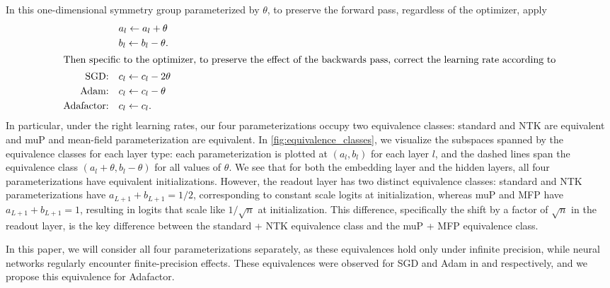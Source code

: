 \documentclass{article}
\theoremstyle{plain}
\theoremstyle{definition}
\theoremstyle{remark}
\begin{document}
In this one-dimensional symmetry group parameterized by $\theta$, to preserve the forward pass, regardless of the optimizer, apply
\begingroup
\begin{align*}
    &a_l \leftarrow a_l + \theta\MoveEqLeft[1]\\
    &b_l \leftarrow b_l - \theta.\\
\intertext{Then specific to the optimizer, to preserve the effect of the backwards pass, correct the learning rate according to}
    \textrm{SGD:}\quad&c_l \leftarrow c_l - 2\theta\\
    \textrm{Adam:}\quad&c_l \leftarrow c_l - \theta\\
    \textrm{Adafactor:}\quad&c_l \leftarrow c_l.
\end{align*}
\endgroup
In particular, under the right learning rates, our four parameterizations occupy two equivalence classes: standard and NTK are equivalent and muP and mean-field parameterization are equivalent. In \cref{fig:equivalence_classes}, we visualize the subspaces spanned by the equivalence classes for each layer type: each parameterization is plotted at $(a_l, b_l)$ for each layer $l$, and the dashed lines span the equivalence class $(a_l + \theta, b_l - \theta)$ for all values of $\theta$. We see that for both the embedding layer and the hidden layers, all four parameterizations have equivalent initializations. However, the readout layer has two distinct equivalence classes: standard and NTK parameterizations have $a_{L+1} + b_{L+1} = 1/2$, corresponding to constant scale logits at initialization, whereas muP and MFP have $a_{L+1} + b_{L+1} = 1$, resulting in logits that scale like $1/\sqrt{n}$ at initialization. This difference, specifically the shift by a factor of $\sqrt{n}$ in the readout layer, is the key difference between the standard + NTK equivalence class and the muP + MFP equivalence class. 


In this paper, we will consider all four parameterizations separately, as these equivalences hold only under infinite precision, while neural networks regularly encounter finite-precision effects. These equivalences were observed for SGD and Adam in \citet{yang2021tensoriv} and \citet{yang2023tensorivb} respectively, and we propose this equivalence for Adafactor.




\newcolumntype{C}{>{\centering\arraybackslash}}
\end{document}
